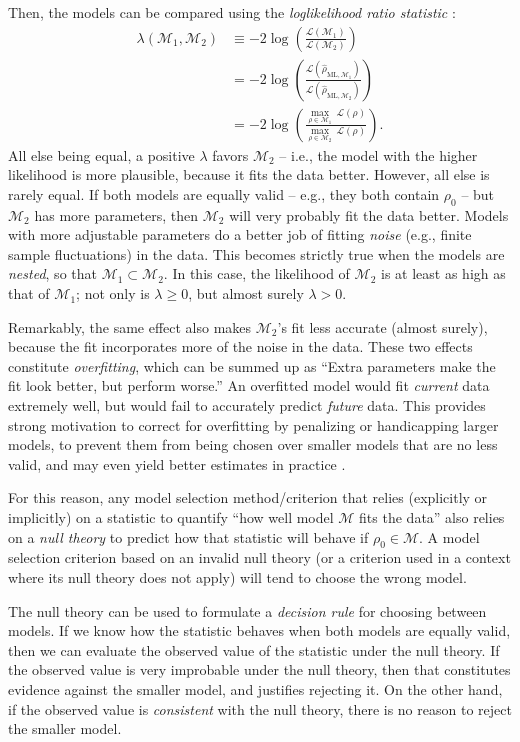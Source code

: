 \documentclass[aps,pra, twocolumn]{revtex4-1}
\newcommand{\M}{\mathcal{M}}
\newcommand{\cL}{\mathcal{L}}
\newcommand{\rhohat}{\hat{\rho}}
\newcommand{\rhoML}[1]{\rhohat_{\scriptscriptstyle{\mathrm{ML},#1}}}
\begin{document}
Then, the models can be compared using the \emph{loglikelihood ratio statistic} \cite{Neyman1933, Blume-Kohout2010, Moroder2013}:
\begin{align}
\nonumber \lambda(\M_{1}, \M_{2}) &\equiv -2 \log \left(\frac{\cL(\M_{1})}{\cL(\M_{2})}\right)\\
\nonumber &= -2 \log \left(\frac{\cL(\rhoML{\M_{1}})}{\cL(\rhoML{\M_{2}})}\right)\\
&= -2 \log \left(\frac{\underset{\rho \in \M_{1}}{\max}~\cL(\rho)}{\underset{\rho \in \M_{2}}{\max}~\cL(\rho)}\right).
\end{align}
All else being equal, a positive $\lambda$ favors $\M_2$ -- i.e., the model with the higher likelihood is more plausible, because it fits the data better.  However, all else is rarely equal.  If both models are equally valid -- e.g., they both contain $\rho_0$ -- but $\M_2$ has more parameters, then $\M_2$ will very probably fit the data better.  Models with more adjustable parameters do a better job of fitting \emph{noise} (e.g., finite sample fluctuations) in the data.  This becomes strictly true when the models are \emph{nested}, so that $\M_{1} \subset \M_{2}$.  In this case, the likelihood of $\M_{2}$ is at least as high as that of $\M_{1}$;  not only is $\lambda \geq 0$, but almost surely $\lambda > 0$.

Remarkably, the same effect also makes $\M_{2}$'s fit less accurate (almost surely), because the fit incorporates more of the noise in the data.  These two effects constitute \emph{overfitting}, which can be summed up as ``Extra parameters make the fit look better, but perform worse.''  An overfitted model would fit \emph{current} data extremely well,  but would fail to accurately predict \emph{future} data. This provides strong motivation to correct for overfitting by penalizing or handicapping larger models, to prevent them from being chosen over smaller models that are no less valid, and may even yield better estimates in practice \cite{Akaike1974}.

For this reason, any model selection method/criterion that relies (explicitly or implicitly) on a statistic to quantify ``how well model $\M$ fits the data'' also relies on a \emph{null theory} to predict how that statistic will behave if $\rho_{0} \in \M$.  A model selection criterion based on an invalid null theory (or a criterion used in a context where its null theory does not apply) will tend to choose the wrong model.

The null theory can be used to formulate a \emph{decision rule} for choosing between models. If we know how the statistic behaves when both models are equally valid, then we can evaluate the observed value of the statistic under the null theory. If the observed value is very improbable under the null theory, then that constitutes evidence against the smaller model, and justifies rejecting it. On the other hand, if the observed value is \emph{consistent} with the null theory, there is no reason to reject the smaller model.
\end{document}
